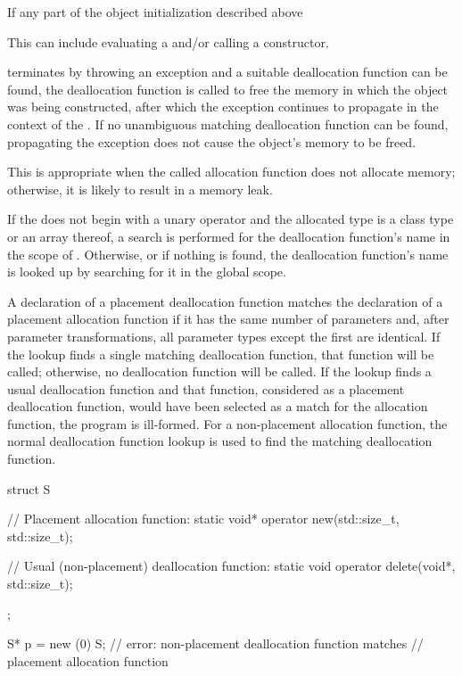 \pnum
{}%
If any part of the object initialization described above%
\begin{footnote}
This can
include evaluating a  and/or calling
a constructor.
\end{footnote}
terminates by throwing an exception and a suitable deallocation function
can be found, the deallocation function is called to free the memory in
which the object was being constructed, after which the exception
continues to propagate in the context of the .
If no unambiguous matching deallocation function can be found,
propagating the exception does not cause the object's memory to be
freed.
\begin{note}
This is appropriate when the called allocation function does not
allocate memory; otherwise, it is likely to result in a memory leak.
\end{note}

\pnum
If the  does not begin with
a unary \tcode{::} operator and
the allocated type is a class type  or an array thereof,
a search is performed for the deallocation function's name
in the scope of .
Otherwise, or if nothing is found,
the deallocation function's name is looked up by
searching for it in the global scope.

\pnum
A declaration of a placement deallocation function matches the
declaration of a placement allocation function if it has the same number
of parameters and, after parameter transformations, all
parameter types except the first are identical. If
the lookup finds a single matching deallocation function, that function
will be called; otherwise, no deallocation function will be called. If
the lookup finds a usual deallocation
function
and that function,
considered as a placement deallocation function, would have been
selected as a match for the allocation function, the program is
ill-formed. For a non-placement allocation function, the normal deallocation
function lookup is used to find the matching deallocation
function.
\begin{example}
\begin{codeblock}
struct S {
  // Placement allocation function:
  static void* operator new(std::size_t, std::size_t);

  // Usual (non-placement) deallocation function:
  static void operator delete(void*, std::size_t);
};

S* p = new (0) S;   // error: non-placement deallocation function matches
                    // placement allocation function
\end{codeblock}
\end{example}

